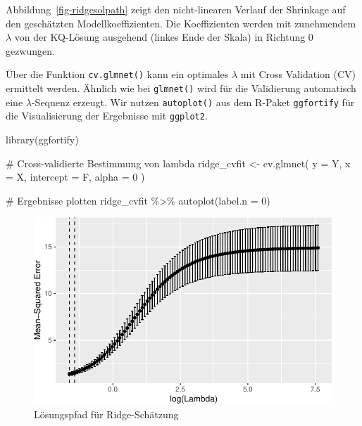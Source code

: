 \documentclass[
  a4paper,
  DIV=11,
  oneside]{scrreprt}
\newenvironment{Shaded}{\begin{snugshade}}{\end{snugshade}}
\newcommand{\AttributeTok}[1]{\textcolor[rgb]{0.40,0.45,0.13}{#1}}
\newcommand{\CommentTok}[1]{\textcolor[rgb]{0.37,0.37,0.37}{#1}}
\newcommand{\DecValTok}[1]{\textcolor[rgb]{0.68,0.00,0.00}{#1}}
\newcommand{\FunctionTok}[1]{\textcolor[rgb]{0.28,0.35,0.67}{#1}}
\newcommand{\NormalTok}[1]{\textcolor[rgb]{0.00,0.23,0.31}{#1}}
\newcommand{\OtherTok}[1]{\textcolor[rgb]{0.00,0.23,0.31}{#1}}
\newcommand{\SpecialCharTok}[1]{\textcolor[rgb]{0.37,0.37,0.37}{#1}}
\begin{document}
Abbildung~\ref{fig-ridgesolpath} zeigt den nicht-linearen Verlauf der
Shrinkage auf den geschätzten Modellkoeffizienten. Die Koeffizienten
werden mit zunehmendem \(\lambda\) von der KQ-Lösung ausgehend (linkes
Ende der Skala) in Richtung 0 gezwungen.

Über die Funktion \texttt{cv.glmnet()} kann ein optimales \(\lambda\)
mit Cross Validation (CV) ermittelt werden. Ähnlich wie bei
\texttt{glmnet()} wird für die Validierung automatisch eine
\(\lambda\)-Sequenz erzeugt. Wir nutzen \texttt{autoplot()} aus dem
R-Paket \texttt{ggfortify} für die Visualisierung der Ergebnisse mit
\texttt{ggplot2}.

\begin{Shaded}
\begin{Highlighting}[]
\FunctionTok{library}\NormalTok{(ggfortify)}

\CommentTok{\# Cross{-}validierte Bestimmung von lambda}
\NormalTok{ridge\_cvfit }\OtherTok{\textless{}{-}} \FunctionTok{cv.glmnet}\NormalTok{(}
  \AttributeTok{y =}\NormalTok{ Y, }
  \AttributeTok{x =}\NormalTok{ X, }
  \AttributeTok{intercept =}\NormalTok{ F,}
  \AttributeTok{alpha =} \DecValTok{0}
\NormalTok{) }

\CommentTok{\# Ergebnisse plotten}
\NormalTok{ridge\_cvfit }\SpecialCharTok{\%\textgreater{}\%} 
  \FunctionTok{autoplot}\NormalTok{(}\AttributeTok{label.n =} \DecValTok{0}\NormalTok{)}
\end{Highlighting}
\end{Shaded}

\begin{figure}[t]

{\centering \includegraphics{RegReg_files/figure-pdf/fig-ridgecvplot-1.pdf}

}

\caption{\label{fig-ridgecvplot}Lösungspfad für Ridge-Schätzung}

\end{figure}
\end{document}
